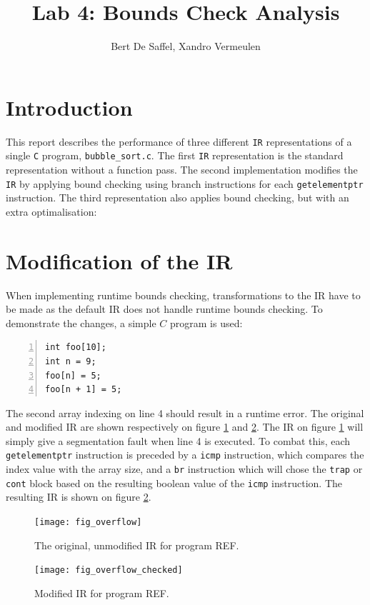 \documentclass{article}
\title{Lab 4: Bounds Check Analysis}
\author{Bert De Saffel, Xandro Vermeulen}
\begin{document}
	\maketitle
	\tableofcontents
	\section{Introduction}
	This report describes the performance of three different \texttt{IR} representations of a single \texttt{C} program, \texttt{bubble\_sort.c}. The first \texttt{IR} representation is the standard representation without a function pass. The second implementation modifies the \texttt{IR} by applying bound checking using branch instructions for each \texttt{getelementptr} instruction. The third representation also applies bound checking, but with an extra optimalisation: 
	
	\section{Modification of the IR}
	When implementing runtime bounds checking, transformations to the IR have to be made as the default IR does not handle runtime bounds checking. To demonstrate the changes, a simple $C$ program is used:
	\begin{lstlisting}[numbers=left]
int foo[10];
int n = 9;
foo[n] = 5;
foo[n + 1] = 5;
	\end{lstlisting}
The second array indexing on line 4 should result in a runtime error. The original and modified IR are shown respectively on figure \ref{fig:original_ir} and \ref{fig:modified_ir}. The IR on figure \ref{fig:original_ir} will simply give a segmentation fault when line 4 is executed. To combat this, each \texttt{getelementptr} instruction is preceded by a \texttt{icmp} instruction, which compares the index value with the array size, and a \texttt{br} instruction which will chose the \texttt{trap} or \texttt{cont} block based on the resulting boolean value of the \texttt{icmp} instruction. The resulting IR is shown on figure \ref{fig:modified_ir}.

\begin{figure}
	\texttt{[image: fig\_overflow]}
	\caption{The original, unmodified IR for program REF.}
	\label{fig:original_ir}
\end{figure}

\begin{figure}
	\texttt{[image: fig\_overflow\_checked]}
	\caption{Modified IR for program REF.}
	\label{fig:modified_ir}
\end{figure}
\end{document}

